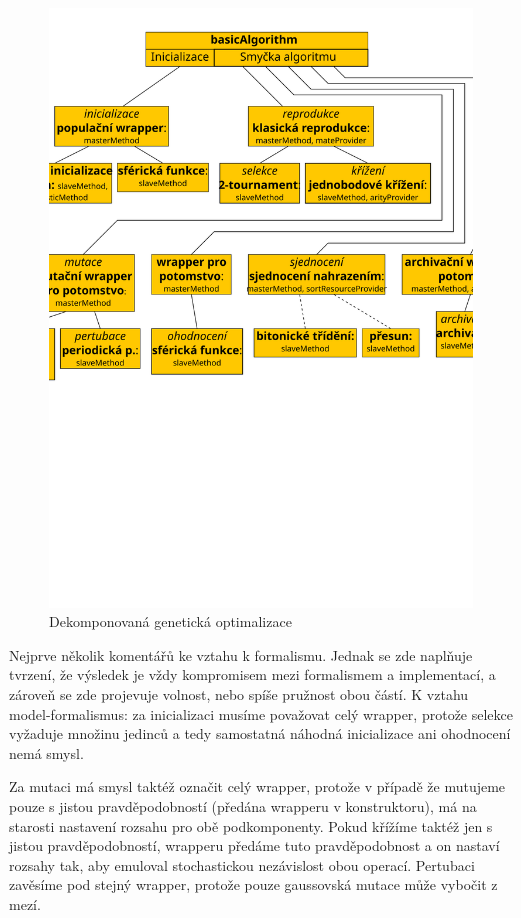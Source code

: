 \begin{figure}[h!]
\begin{center}
  \includegraphics[width=\textwidth]{img/GO}
  \caption{Dekomponovaná genetická optimalizace}\label{GO dekomp}
  \end{center}
\end{figure}

Nejprve několik komentářů ke vztahu k formalismu. Jednak se zde naplňuje tvrzení, že výsledek je vždy kompromisem mezi formalismem a implementací, a zároveň se zde projevuje volnost, nebo spíše pružnost obou částí. K vztahu model-formalismus: za inicializaci musíme považovat celý wrapper, protože selekce vyžaduje množinu jedinců a tedy samostatná náhodná inicializace ani ohodnocení nemá smysl.

Za mutaci má smysl taktéž označit celý wrapper, protože v případě že mutujeme pouze s jistou pravděpodobností (předána wrapperu v konstruktoru), má na starosti nastavení rozsahu pro obě podkomponenty. Pokud křížíme taktéž jen s jistou pravděpodobností, wrapperu předáme tuto pravděpodobnost a on nastaví rozsahy tak, aby emuloval stochastickou nezávislost obou operací. Pertubaci zavěsíme pod stejný wrapper, protože pouze gaussovská mutace může vybočit z mezí. 

